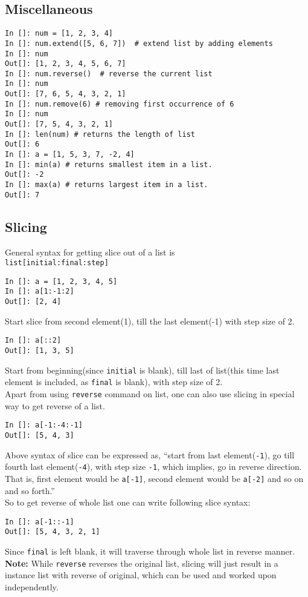 \documentclass[12pt]{article}
\newcommand{\typ}[1]{\lstinline{#1}}
\begin{document}
\subsection{Miscellaneous}
\begin{lstlisting}
In []: num = [1, 2, 3, 4]
In []: num.extend([5, 6, 7])  # extend list by adding elements
In []: num
Out[]: [1, 2, 3, 4, 5, 6, 7]
In []: num.reverse()  # reverse the current list
In []: num
Out[]: [7, 6, 5, 4, 3, 2, 1]
In []: num.remove(6) # removing first occurrence of 6
In []: num
Out[]: [7, 5, 4, 3, 2, 1]
In []: len(num) # returns the length of list
Out[]: 6
In []: a = [1, 5, 3, 7, -2, 4]
In []: min(a) # returns smallest item in a list.
Out[]: -2
In []: max(a) # returns largest item in a list.
Out[]: 7
\end{lstlisting}

\subsection{Slicing} 
General syntax for getting slice out of a list is \\
\typ{list[initial:final:step]}
\begin{lstlisting}
In []: a = [1, 2, 3, 4, 5]
In []: a[1:-1:2] 
Out[]: [2, 4]
\end{lstlisting}
Start slice from second element(1), till the last element(-1) with step size of 2.
\begin{lstlisting}
In []: a[::2]
Out[]: [1, 3, 5]
\end{lstlisting}
Start from beginning(since \typ{initial} is blank), till last of list(this time last element is included, as \typ{final} is blank), with step size of 2.\\
Apart from using \typ{reverse} command on list, one can also use slicing in special way to get reverse of a list.
\begin{lstlisting}
In []: a[-1:-4:-1]
Out[]: [5, 4, 3]
\end{lstlisting}
Above syntax of slice can be expressed as, ``start from last element(\typ{-1}), go till fourth last element(\typ{-4}), with step size \typ{-1}, which implies, go in reverse direction. That is, first element would be \typ{a[-1]}, second element would be \typ{a[-2]} and so on and so forth.''\\
So to get reverse of whole list one can write following slice syntax:
\begin{lstlisting}
In []: a[-1::-1]
Out[]: [5, 4, 3, 2, 1]
\end{lstlisting}
Since \typ{final} is left blank, it will traverse through whole list in reverse manner.\\
\textbf{Note:} While \typ{reverse} reverses the original list, slicing will just result in a instance list with reverse of original, which can be used and worked upon independently.
\end{document}
